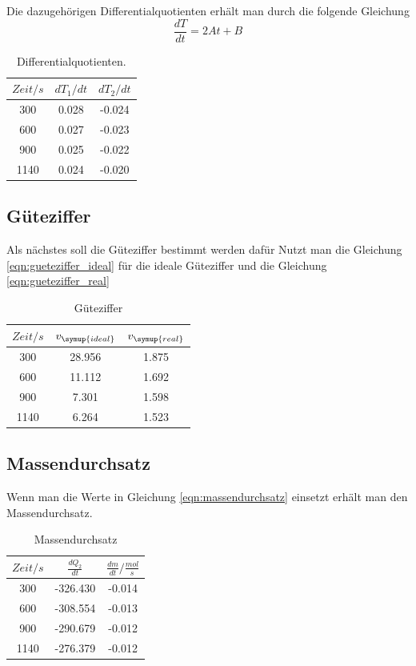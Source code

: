 Die dazugehörigen Differentialquotienten erhält man durch die folgende Gleichung
\begin{equation}
\frac{dT}{dt}=2At+B
\end{equation}

\begin{table}
  \centering
  \begin{tabular}{c c c}
    \toprule
    $Zeit/s$ & $dT_1 /dt$ & $dT_2 /dt$ \\
    \midrule
    300  &  0.028 & -0.024  \\
    600  &  0.027 & -0.023  \\
    900  &  0.025 & -0.022  \\
   1140  &  0.024 & -0.020  \\
   \bottomrule
 \end{tabular}
 \caption{Differentialquotienten.}
 \label{tab:Diffquo}
\end{table}
\subsection{Güteziffer}
Als nächstes soll die Güteziffer bestimmt werden dafür Nutzt man die Gleichung
\eqref{eqn:gueteziffer_ideal} für die ideale Güteziffer und die Gleichung
\eqref{eqn:gueteziffer_real}
\begin{table}
  \centering

  \begin{tabular}{c c c}
    \toprule
    $Zeit/s$ & $v_\symup{ideal}$ &  $v_\symup{real}$ \\
    \midrule
      300  &  28.956  &  1.875 \\
      600  &  11.112  &  1.692 \\
      900  &  7.301  &  1.598 \\
     1140  &  6.264  &  1.523 \\
   \bottomrule
 \end{tabular}
 \caption{Güteziffer}
 \label{tab:Gütez}
\end{table}
\subsection{Massendurchsatz}
Wenn man die Werte in Gleichung \eqref{eqn:massendurchsatz} einsetzt erhält man
den Massendurchsatz.
\begin{table}
  \centering
\begin{tabular}{c c c}
  \toprule
  $Zeit /s$ & $\frac{dQ_2}{dt}$ & $\frac{dm}{dt} /\frac{mol}{s}$  \\
  \midrule
  300  &   -326.430  & -0.014  \\
  600  &   -308.554  & -0.013  \\
  900  &   -290.679  & -0.012  \\
 1140  &   -276.379  & -0.012  \\
 \bottomrule
\end{tabular}
\caption{Massendurchsatz}
\label{tab:Massend}
\end{table}
